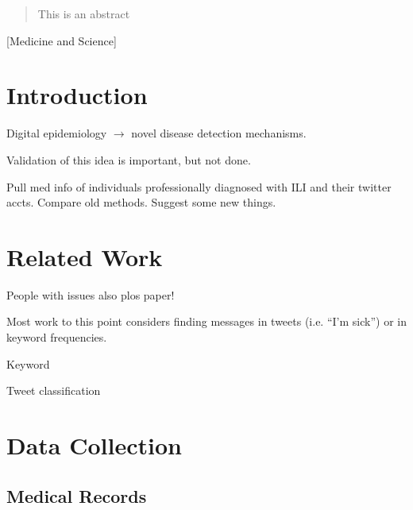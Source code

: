 \documentclass{acm_proc_article-sp}
\begin{document}
\maketitle
\begin{abstract}
This is an abstract
\end{abstract}

[Medicine and Science]



\section{Introduction}
Digital epidemiology \(\to\) novel disease detection mechanisms.

Validation of this idea is important, but not done.

Pull med info of individuals professionally diagnosed with ILI and their twitter accts. Compare old methods. Suggest some new things.

\section{Related Work}

People with issues \cite{Bodnar:2013we,Butler:2013uh,Lamb:2013to} also plos paper!

Most work to this point considers finding messages in tweets (i.e. ``I'm sick'') or in keyword frequencies. 

Keyword \cite{Culotta:2010hx,Goel:2010jf}

Tweet classification \cite{Culotta:2010hx,Lamb:2013to,Salathe:2011gr}

\section{Data Collection}
\subsection{Medical Records}
\end{document}
